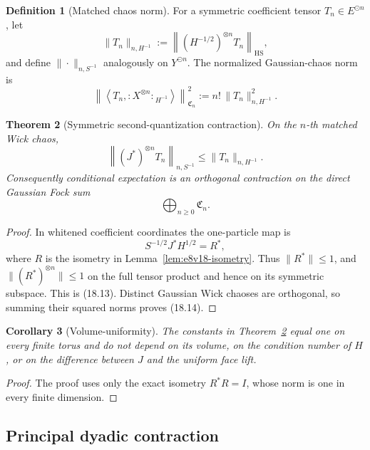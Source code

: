 \documentclass[11pt,oneside]{book}
\newtheorem{theorem}{Theorem}[chapter]
\newtheorem{corollary}[theorem]{Corollary}
\theoremstyle{definition}
\newtheorem{definition}[theorem]{Definition}
\theoremstyle{remark}
\begin{document}
\begin{definition}[Matched chaos norm]
\label{def:e8v18-chaos-norm}
For a symmetric coefficient tensor \(T_n\in E^{\odot n}\), let
\[
 \|T_n\|_{n,H^{-1}}
 :=\left\|(H^{-1/2})^{\otimes n}T_n\right\|_{\mathrm{HS}},          \tag{18.11}
\]
and define \(\|\cdot\|_{n,S^{-1}}\) analogously on \(Y^{\odot n}\).
The normalized Gaussian-chaos norm is
\[
 \left\|
 \left\langle T_n,{:X^{\otimes n}:}_{H^{-1}}\right\rangle
 \right\|_{\mathfrak C_n}^2
 :=n!\,\|T_n\|_{n,H^{-1}}^2.                                      \tag{18.12}
\]
\end{definition}

\begin{theorem}[Symmetric second-quantization contraction]
\label{thm:e8v18-second-quantization}
On the \(n\)-th matched Wick chaos,
\[
 \left\|(J^*)^{\otimes n}T_n\right\|_{n,S^{-1}}
 \leq\|T_n\|_{n,H^{-1}}.                                          \tag{18.13}
\]
Consequently conditional expectation is an orthogonal contraction on
the direct Gaussian Fock sum
\[
                    \bigoplus_{n\geq0}\mathfrak C_n.               \tag{18.14}
\]
\end{theorem}

\begin{proof}
In whitened coefficient coordinates the one-particle map is
\[
 S^{-1/2}J^*H^{1/2}=R^*,
\]
where \(R\) is the isometry in Lemma~\ref{lem:e8v18-isometry}.
Thus \(\|R^*\|\leq1\), and
\(\|(R^*)^{\otimes n}\|\leq1\) on the full tensor product and hence on
its symmetric subspace.  This is (18.13).  Distinct Gaussian Wick
chaoses are orthogonal, so summing their squared norms proves (18.14).
\end{proof}

\begin{corollary}[Volume-uniformity]
\label{cor:e8v18-volume}
The constants in
Theorem~\ref{thm:e8v18-second-quantization} equal one on every finite
torus and do not depend on its volume, on the condition number of
\(H\), or on the difference between \(J\) and the uniform face lift.
\end{corollary}

\begin{proof}
The proof uses only the exact isometry \(R^*R=I\), whose norm is one
in every finite dimension.
\end{proof}

\subsection{Principal dyadic contraction}
\end{document}
